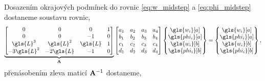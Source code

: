 Dosazením okrajových podmínek do rovnic \ref{eq:w_midstep} a \ref{eq:phi_midstep} dostaneme soustavu rovnic,
\begin{equation} \label{eq:eb_beam_A}
    \underbrace{
    \begin{bmatrix}
        0 & 0 & 0 & 1 \\
        0 & 0 & -1 & 0 \\
        \gls{L}^{3} & \gls{L}^{2} & \gls{L} & 1 \\
        -3 \gls{L}^{2} & -2 \gls{L} & -1 & 0 \\
    \end{bmatrix}}_{\matr{A}}
    \begin{bmatrix}
        a_1 & a_2 & a_3 & a_4 \\
        b_1 & b_2 & b_3 & b_4 \\
        c_1 & c_2 & c_3 & c_4 \\
        d_1 & d_2 & d_3 & d_4 \\
    \end{bmatrix}
    \begin{Bmatrix}
        \gls{w_i}[a] \\
        \gls{phi_i}[a] \\
        \gls{w_i}[b] \\
        \gls{phi_i}[b] \\
    \end{Bmatrix}
    =
    \begin{Bmatrix}
        \gls{w_i}[a] \\
        \gls{phi_i}[a] \\
        \gls{w_i}[b] \\
        \gls{phi_i}[b] \\
    \end{Bmatrix},
\end{equation}
přenásobením zleva maticí $\mathbf{A}^{-1}$ dostaneme,

